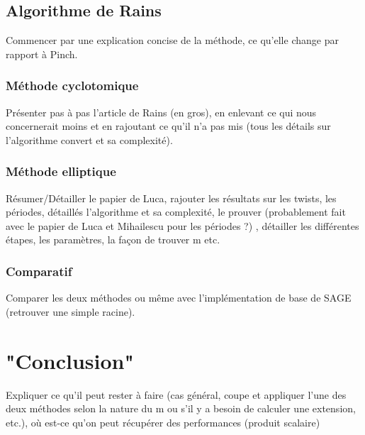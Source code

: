 \documentclass[a4paper]{article} %
\numberwithin{equation}{section}
\begin{document}
\subsection{Algorithme de Rains}
Commencer par une explication concise de la méthode, ce qu'elle change par rapport à Pinch.
\subsubsection{Méthode cyclotomique}
Présenter pas à pas l'article de Rains (en gros), en enlevant ce qui nous 
concernerait moins et en rajoutant ce qu'il n'a pas mis (tous les détails 
sur l'algorithme convert et sa complexité).
\subsubsection{Méthode elliptique}
Résumer/Détailler le papier de Luca, rajouter les résultats sur les twists, 
les périodes, détaillés l'algorithme et sa complexité, le prouver 
(probablement fait avec le papier de Luca et Mihailescu pour les périodes ?)
, détailler les différentes étapes, les paramètres, la façon de trouver m 
etc.
\subsubsection{Comparatif}
Comparer les deux méthodes ou même avec l'implémentation de base de SAGE (retrouver une simple racine).
\section{"Conclusion"}
Expliquer ce qu'il peut rester à faire (cas général, coupe et appliquer 
l'une des deux méthodes selon la nature du m ou s'il y a besoin de calculer 
une extension, etc.), où est-ce qu'on peut récupérer des performances 
(produit scalaire)
\end{document}
